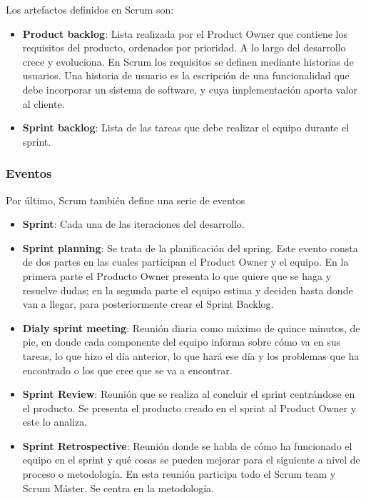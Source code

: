 	Los artefactos definidos en Scrum son:
	
	
	\begin{itemize}
		\item \textbf{Product backlog}: Lista realizada por el Product Owner que contiene los requisitos del producto, ordenados por prioridad. A lo largo del desarrollo crece y evoluciona. En Scrum los requisitos se definen mediante historias de usuarios. Una historia de usuario es la escripción de una funcionalidad que debe incorporar un sistema de software, y cuya implementación aporta valor al cliente.
		\item \textbf{Sprint backlog}: Lista de las tareas que debe realizar el equipo durante el sprint. 
	\end{itemize}
	
	\subsubsection{Eventos}
	Por último, Scrum también define una serie de eventos
	
	
	\begin{itemize}
		\item \textbf{Sprint}: Cada una de las iteraciones del desarrollo.
		\item \textbf{Sprint planning}: Se trata de la planificación del spring. Este evento consta de dos partes en las cuales participan el Product Owner y el equipo. En la primera parte el Producto Owner presenta lo que quiere que se haga y resuelve dudas; en la segunda parte el equipo estima y deciden hasta donde van a llegar, para posteriormente crear el Sprint Backlog.
		\item \textbf{Dialy sprint meeting}: Reunión diaria como máximo de quince minutos, de pie, en donde cada componente del equipo informa sobre cómo va en sus tareas, lo que hizo el día anterior, lo que hará ese día y los problemas que ha encontrado o los que cree que se va a encontrar.
		\item \textbf{Sprint Review}: Reunión que se realiza al concluir el sprint centrándose en el producto. Se presenta el producto creado en el sprint al Product Owner y este lo analiza.
		\item \textbf{Sprint Retrospective}: Reunión donde se habla de cómo ha funcionado el equipo en el sprint y qué cosas se pueden mejorar para el siguiente a nivel de proceso o metodología. En esta reunión participa todo el Scrum team y Scrum Máster. Se centra en la metodología.
	\end{itemize}
	
